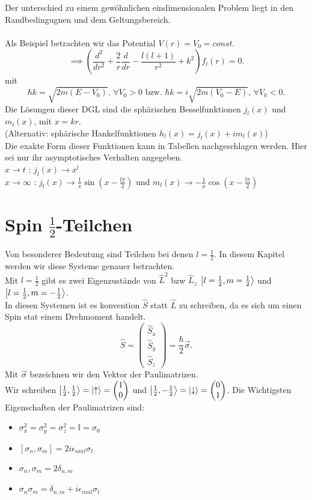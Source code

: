 \documentclass{report}
\begin{document}
Der unterschied zu einem gewöhnlichen eindimensionalen Problem liegt in den Randbedingugnen und dem Geltungsbereich.\\ \\
Als Beispiel betrachten wir das Potential $V(r) = V_0 = const.$\[
	\implies \left( \frac{d^2}{dr^2} + \frac{2}{r} \frac{d}{dr} - \frac{l(l+1)}{r^2} + k^2 \right) f_l(r) = 0
.\] mit \[
\hbar k = \sqrt{2m \left( E - V_0 \right) } \text{, } \forall V_0 > 0 \text{ bzw. } \hbar k = i \sqrt{2m \left( V_0 - E \right)} \text{, } \forall V_0 < 0 
.\] Die Lösungen dieser DGL sind die sphärischen Besselfunktionen $j_l(x)$ und $m_l(x)$, mit $x = kr$.\\
(Alternativ: sphärische Hankelfunktionen $h_l(x) = j_l(x) + i m_l(x)$)\\
Die exakte Form dieser Funktionen kann in Tabellen nachgeschlagen werden. Hier sei nur ihr asymptotisches Verhalten angegeben. \\
$x \to t$ : $j_l(x) \to x^l$\\
$x \to  \infty$ : $j_l(x) \to \frac{1}{x} \sin(x - \frac{l \pi}{2})$ und $m_l(x) \to  -\frac{1}{x} \cos(x - \frac{l \pi}{2})$
\section{Spin $\frac{1}{2}$-Teilchen}
Von besonderer Bedeutung sind Teilchen bei denen $l = \frac{1}{2}$. In diesem Kapitel werden wir diese Systeme genauer betrachten. \\
Mit $l = \frac{1}{2}$ gibt es zwei Eigenzustände von $\hat{L}^2$ bzw $\hat{L}_z$ $\ket{l = \frac{1}{2}, m = \frac{1}{2}} $ und $\ket{l = \frac{1}{2}, m = - \frac{1}{2}} $. \\
In diesen Systemen ist es konvention $\hat{S}$ statt $\hat{L}$ zu schreiben, da es sich um einen Spin stat einem Drehmoment handelt. \[
	\hat{S} = \begin{pmatrix} \hat{S}_x \\ \hat{S}_y \\ \hat{S}_z \end{pmatrix} = \frac{\hbar}{2} \vec{\sigma}
.\] Mit $\vec{\sigma}$ bezeichnen wir den Vektor der Paulimatrizen. \\ 
Wir schreiben $\ket{\frac{1}{2}, \frac{1}{2}} = \ket{\uparrow} = \begin{pmatrix} 1 \\ 0 \end{pmatrix}  $ und $\ket{\frac{1}{2}, -\frac{1}{2}} = \ket{\downarrow} = \begin{pmatrix} 0 \\ 1 \end{pmatrix}  $.
Die Wichtigsten Eigenschaften der Paulimatrizen sind:
\begin{itemize}
	\item $\sigma_x^2 = \sigma_y^2 = \sigma_z^2 = \mathbb{I} = \sigma_0$
	\item  $[\sigma_n, \sigma_m] =2i \epsilon_{nml} \sigma_l $
	\item ${\sigma_n, \sigma_m} = 2 \delta_{n,m}$
	\item  $\sigma_n \sigma_m = \delta_{n,m} + i \epsilon_{nml} \sigma_l$
\end{itemize}
\end{document}
